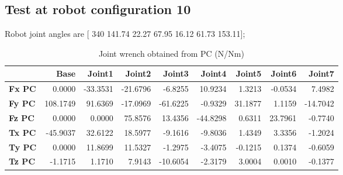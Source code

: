 
\subsection{Test at robot configuration 10}
Robot joint angles are  [ 340        141.74         22.27         67.95         16.12         61.73        153.11];

\begin{table}[h!]
	\centering
	\caption{Joint wrench obtained from PC (N/Nm)}
	\label{wrech_PC_Pose10}
	\begin{tabular}{|l|r|r|r|r|r|r|r|r|}
		\hline
		\textbf{}  & \textbf{Base} & \textbf{Joint1}  & \textbf{Joint2}  & \textbf{Joint3}  & \textbf{Joint4}  & \textbf{Joint5}  & \textbf{Joint6}  & \textbf{Joint7} \\ \hline
		\textbf{Fx PC}  & 0.0000        & -33.3531        & -21.6796        & -6.8255        & 10.9234        & 1.3213        & -0.0534        & 7.4982 \\ \hline
		\textbf{Fy PC}  & 108.1749        & 91.6369        & -17.0969        & -61.6225        & -0.9329        & 31.1877        & 1.1159        & -14.7042 \\ \hline
		\textbf{Fz PC}  & 0.0000        & 0.0000        & 75.8576        & 13.4356        & -44.8298        & 0.6311        & 23.7961        & -0.7740 \\ \hline
		\textbf{Tx PC}  & -45.9037        & 32.6122        & 18.5977        & -9.1616        & -9.8036        & 1.4349        & 3.3356        & -1.2024 \\ \hline
		\textbf{Ty PC}  & 0.0000        & 11.8699        & 11.5327        & -1.2975        & -3.4075        & -0.1215        & 0.1374        & -0.6059 \\ \hline
		\textbf{Tz PC}  & -1.1715        & 1.1710        & 7.9143        & -10.6054        & -2.3179        & 3.0004        & 0.0010        & -0.1377 \\ \hline
	\end{tabular}
\end{table}

